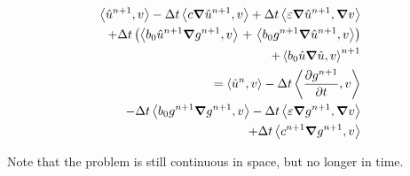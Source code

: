 \documentclass[../../thesis.tex]{subfiles}
\newcommand{\inner}[2]{\left<#1, #2\right>}
\newcommand{\dt}{\ensuremath{\Delta t}}
\begin{document}
\begin{subequations}
    \label{eq:1d_fom_weak_formulation_homogeneous}
    \begin{align}
        \inner{\hat{u}^{n+1}}{v} 
        - \dt \inner{c \grad \hat{u}^{n+1}}{v} 
        + \dt \inner{\varepsilon \grad \hat{u}^{n+1}}{\grad v} \nonumber\\
        + \dt\left(\inner{b_0 \hat{u}^{n+1} \grad g^{n+1}}{v}\right. 
        + \left.\inner{b_0 g^{n+1} \grad \hat{u}^{n+1}}{v}\right) \nonumber\\
        + \inner{b_0 \hat{u} \grad \hat{u}}{v}^{n+1} \nonumber\\
        = 
        \inner{\hat{u}^{n}}{v} 
        - \dt \inner{\frac{\partial g^{n+1}}{\partial t}}{v} \nonumber \\
        - \dt \inner{b_0 g^{n+1} \grad g^{n+1}}{v} 
        - \dt \inner{\varepsilon \grad g^{n+1}}{\grad v} \nonumber\\ 
        + \dt \inner{c^{n+1} \grad g^{n+1}}{v}
    \end{align}
\end{subequations}


Note that the problem is still continuous in space, but no longer in time.
\end{document}
